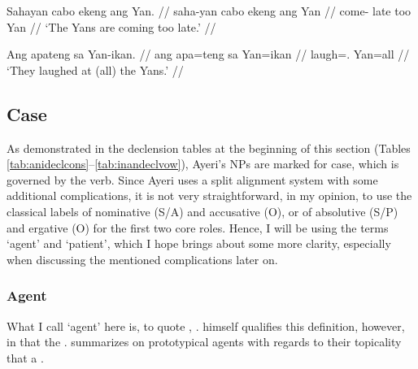 \pex
\a\begingl
	\gla Sahayan cabo ekeng ang Yan. //
	\glb saha-yan cabo ekeng ang Yan //
	\glc come-\TplM{} late too \Aarg{} Yan //
	\glft `The Yans are coming too late.' //
\endgl

\a\begingl
	\gla Ang apateng sa Yan-ikan. //
	\glb ang apa=teng sa Yan=ikan //
	\glc \AgtT{} laugh=\TplF{}.\Aarg{} \Parg{} Yan=all //
	\glft `They laughed at (all) the Yans.' //
\endgl

\xe


\subsection{Case}
\label{subsec:case}

As demonstrated in the declension tables at the beginning of this section
(Tables \ref{tab:anideclcons}–\ref{tab:inandeclvow}), Ayeri's NPs are marked
for case, which is governed by the verb. Since Ayeri uses a split alignment
system with some additional complications, it is not very straightforward, in
my opinion, to use the classical labels of nominative (S/A) and accusative (O),
or of absolutive (S/P) and ergative (O) for the first two core roles. Hence, I
will be using the terms `agent' and `patient', which I hope brings about some
more clarity, especially when discussing the mentioned complications later on.

\subsubsection{Agent}
\label{subsubsec:agent}

What I call `agent' here is, to quote \citet{fillmore1968},
. \citet{fillmore1968}
himself qualifies this definition, however, in that the . \citet{payne1997} summarizes on prototypical agents with regards
to their topicality that a .

